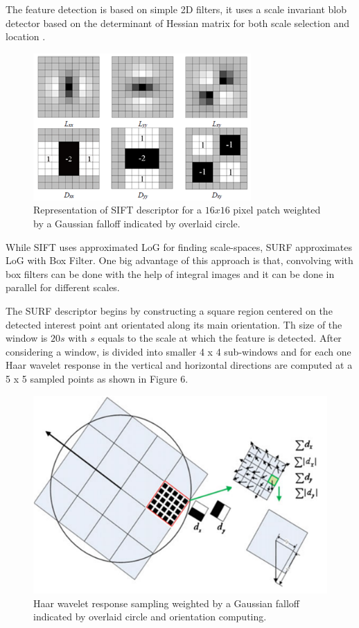 \documentclass[9pt,shortpaper,twoside,web]{ieeecolor}
\begin{document}
The feature detection is based on simple 2D filters, it uses a scale invariant blob detector based on the determinant of Hessian matrix for both scale selection and location \cite{b2}. 
\begin{figure}[htb]
\includegraphics[width=\columnwidth]{res/fig/SURF.png}
\caption{Representation of SIFT descriptor for a $16 x 16$ pixel patch weighted by a Gaussian falloff indicated by overlaid circle.}
\label{fig5}
\end{figure}
While SIFT uses approximated LoG for finding scale-spaces, SURF approximates LoG with Box Filter. One big advantage of this approach is that, convolving with box filters can be done with the help of integral images and it can be done in parallel for different scales.

The SURF descriptor begins by constructing a square region centered on the detected interest point ant orientated along its main orientation. Th size of the window is $20s$ with $s$ equals to the scale at which the feature is detected. After considering a window, is divided into smaller 4 x 4 sub-windows and for each one Haar wavelet response in the vertical and horizontal directions are computed at a 5 x 5 sampled points as shown in Figure 6.

\begin{figure}[htb]
\includegraphics[width=\columnwidth]{res/fig/SURFsampling.png}
\caption{Haar wavelet response sampling weighted by a Gaussian falloff indicated by overlaid circle and orientation computing.}
\label{fig6}
\end{figure}
\end{document}
